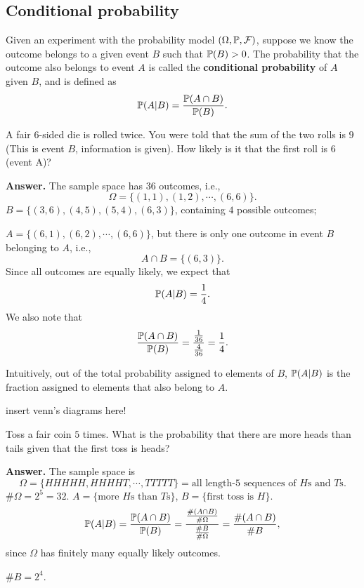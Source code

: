 \subsection{Conditional probability}
\label{subsec:cond-prob}
\begin{definition}
  Given an experiment with the probability model $(\Omega,\mathbb{P}, \mathcal{F})$, suppose we
  know the outcome belongs to a given event $B$ such that $\mathbb{P}(B)>0$. The probability that the
  outcome also belongs to event $A$ is called the \textbf{conditional probability} of $A$
  given $B$, and is defined as
  \[
    \mathbb{P}(A| B) = \frac{\mathbb{P}(A\cap B)}{\mathbb{P}(B)}.
  \]
\end{definition}
\begin{example}
  A fair $6$-sided die is rolled twice. You were told that the sum of the two
  rolls is $9$ (This is event $B$, information is given). How likely is it that
  the first roll is $6$ (event A)?
\end{example}
\textbf{Answer.} The sample space has $36$ outcomes, i.e.,
\[
  \Omega = \{(1,1), (1,2), \cdots, (6,6)\}.
\]
$B = \{(3,6), (4,5), (5,4), (6,3)\}$, containing $4$ possible outcomes;

$A = \{(6,1), (6,2),\cdots, (6,6)\}$, but there is only one outcome in event $B$
belonging to $A$, i.e.,
\[
  A\cap B = \{(6,3)\}.
\]
Since all outcomes are equally likely, we expect that
\[
  \mathbb{P}(A | B) = \frac{1}{4}.
\]
We also note that
\[\displaystyle
  \frac{\mathbb{P}(A\cap B)}{\mathbb{P}(B)} = \frac{\frac{1}{36}}{\frac{4}{36}} = \frac{1}{4}.
\]

Intuitively, out of the total probability assigned to elements of $B$,
$\mathbb{P}(A| B)$ is the fraction assigned to elements that also belong to $A$.

{\color{red} insert venn's diagrams here!}

\begin{example}
  Toss a fair coin $5$ times. What is the probability that there are more heads
  than tails given that the first toss is heads?
\end{example}
\textbf{Answer.} The sample space is
\[
  \Omega = \{HHHHH, HHHHT, \cdots, TTTTT\} = \text{all length-$5$ sequences of
    $H$s and $T$s}.
\]
$\# \Omega = 2^5 = 32$. 
$A = \{\text{more $H$s than $T$s}\}$, $B = \{\text{first toss is $H$}\}$.
\[
  \mathbb{P}(A| B) = \frac{\mathbb{P}(A\cap B)}{\mathbb{P}(B)} = \frac{\frac{\# (A\cap B)}{\#
      \Omega}}{\frac{\# B}{\# \Omega}} = \frac{\# (A\cap B)}{\# B}, 
\]
since $\Omega$ has finitely many equally likely outcomes.

$\# B = 2^4$.

